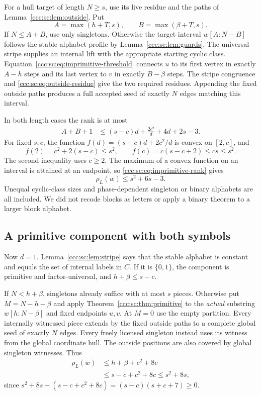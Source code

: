 \documentclass[11pt,letterpaper]{article}
\theoremstyle{definition}
\theoremstyle{remark}
\newcommand{\rank}{\rho}
\begin{document}
For a hull target of length $N\ge s$, use its live residue and the paths of Lemma~\ref{ccc:sc:lem:outside}. Put
\[
 A=\max(h+T,s),\qquad B=\max(\beta+T,s).
\]
If $N\le A+B$, use only singletons. Otherwise the target interval $w[A:N-B]$ follows the stable alphabet profile by Lemma~\ref{ccc:sc:lem:guards}. The universal stripe supplies an internal lift with the appropriate starting cyclic class. Equation~\eqref{ccc:sc:eq:imprimitive-threshold} connects $u$ to its first vertex in exactly $A-h$ steps and its last vertex to $v$ in exactly $B-\beta$ steps. The stripe congruence and \eqref{ccc:sc:eq:outside-residue} give the two required residues. Appending the fixed outside paths produces a full accepted seed of exactly $N$ edges matching this interval.

In both length cases the rank is at most
\begin{align}
 A+B+1
 &\le(s-c)d+\frac{2c^2}{d}+4d+2s-3.\label{ccc:sc:eq:imprimitive-rank}
\end{align}
For fixed $s,c$, the function $f(d)=(s-c)d+2c^2/d$ is convex on $[2,c]$, and
\[
 f(2)=c^2+2(s-c)\le s^2,\qquad
 f(c)=c(s-c+2)\le cs\le s^2.
\]
The second inequality uses $c\ge2$. The maximum of a convex function on an interval is attained at an endpoint, so \eqref{ccc:sc:eq:imprimitive-rank} gives
\begin{equation}\label{ccc:sc:eq:imprimitive-result}
 \rank_L(w)\le s^2+6s-3.
\end{equation}
Unequal cyclic-class sizes and phase-dependent singleton or binary alphabets are all included. We did not recode blocks as letters or apply a binary theorem to a larger block alphabet.

\subsection{A primitive component with both symbols}

Now $d=1$. Lemma~\ref{ccc:sc:lem:stripe} says that the stable alphabet is constant and equals the set of internal labels in $C$. If it is $\{0,1\}$, the component is primitive and factor-universal, and $h+\beta\le s-c$.

If $N<h+\beta$, singletons already suffice with at most $s$ pieces. Otherwise put $M=N-h-\beta$ and apply Theorem~\ref{ccc:sc:thm:primitive} to the \emph{actual} substring $w[h:N-\beta]$ and fixed endpoints $u,v$. At $M=0$ use the empty partition. Every internally witnessed piece extends by the fixed outside paths to a complete global seed of exactly $N$ edges. Every freely licensed singleton instead uses its witness from the global coordinate hull. The outside positions are also covered by global singleton witnesses. Thus
\begin{align*}
 \rank_L(w)&\le h+\beta+c^2+8c\\
 &\le s-c+c^2+8c\le s^2+8s,
\end{align*}
since $s^2+8s-(s-c+c^2+8c)=(s-c)(s+c+7)\ge0$.
\end{document}
